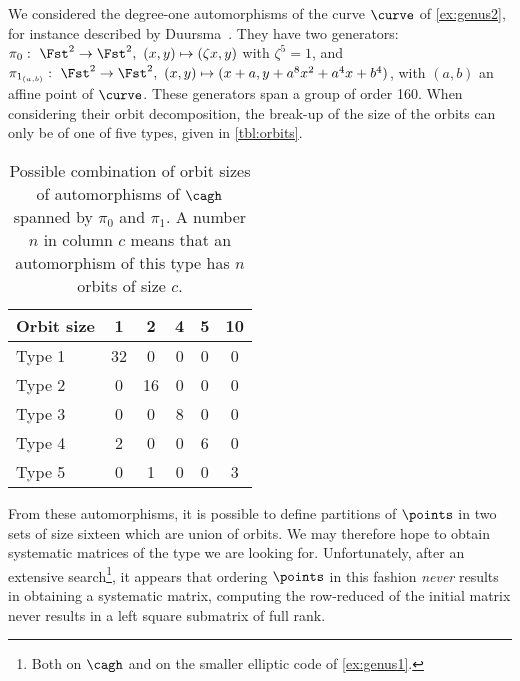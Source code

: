 We considered the degree-one automorphisms of the curve $\curve$ of \autoref{ex:genus2}, for instance described
by Duursma~\cite{duursma}. They have two generators: $\pi_0:~\Fst^2 \rightarrow \Fst^2,~(x, y) \mapsto (\zeta x, y)$ with $\zeta^5 = 1$, and
$\pi_{1_{(a,b)}}:~\Fst^2 \rightarrow \Fst^2,~(x, y) \mapsto (x + a, y + a^8 x^2 + a^4 x + b^4)$, with $(a, b)$ an affine point of $\curve$.
These generators span a group of order 160.
When considering their orbit decomposition, the break-up of the size of the orbits can only be of one of five types, given
in \autoref{tbl:orbits}.

\begin{table}[!h]
\caption[Possible combination of orbit sizes of automorphisms of $\cagh$ spanned by $\pi_0$ and $\pi_1$.]{Possible combination of orbit sizes of automorphisms of $\cagh$ spanned by $\pi_0$ and $\pi_1$.
A number $n$ in column $c$ means that an automorphism of this type has $n$ orbits of size $c$.
\label{tbl:orbits}}
\begin{center}
\begin{tabular}{ l  c  c  c  c  c}
\toprule
 Orbit size & 1 & 2 & 4 & 5 & 10 \\
\midrule
Type 1 & 32 & 0 & 0 & 0 & 0\\

Type 2 & 0 & 16 & 0 & 0 & 0\\

Type 3 & 0 & 0 & 8 & 0 & 0\\

Type 4 & 2 & 0 & 0 & 6 & 0\\

Type 5 & 0 & 1 & 0 & 0 & 3\\
\bottomrule
\end{tabular}
\end{center}
\end{table}
\noindent
From these automorphisms, it is possible to define partitions of $\points$ in two sets of size sixteen which are union of orbits. We may therefore
hope to obtain systematic matrices of the type we are looking for. Unfortunately, after an extensive search\footnote{Both on $\cagh$ and
on the smaller elliptic code of \autoref{ex:genus1}.}, it appears that ordering $\points$ in this fashion \emph{never} results in
obtaining a systematic matrix, \ie computing the row-reduced of the initial matrix never results in a left square submatrix of full rank.


